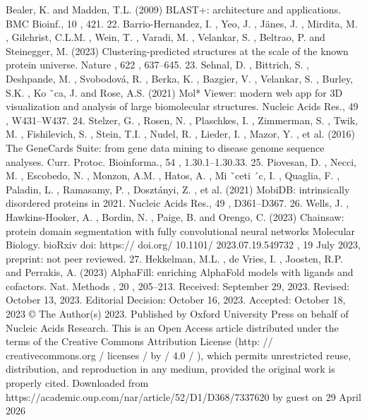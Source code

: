 Bealer, K. and Madden, T.L. (2009) BLAST+: architecture and
applications. BMC Bioinf., 10 , 421.
22. Barrio-Hernandez, I. , Yeo, J. , Jänes, J. , Mirdita, M. , Gilchrist, C.L.M. ,
Wein, T. , Varadi, M. , Velankar, S. , Beltrao, P. and Steinegger, M.
(2023) Clustering-predicted structures at the scale of the known
protein universe. Nature , 622 , 637–645.
23. Sehnal, D. , Bittrich, S. , Deshpande, M. , Svobodová, R. , Berka, K. ,
Bazgier, V. , Velankar, S. , Burley, S.K. , Ko ˇca, J. and Rose, A.S. (2021)
Mol* Viewer: modern web app for 3D visualization and analysis
of large biomolecular structures. Nucleic Acids Res., 49 ,
W431–W437.
24. Stelzer, G. , Rosen, N. , Plaschkes, I. , Zimmerman, S. , Twik, M. ,
Fishilevich, S. , Stein, T.I. , Nudel, R. , Lieder, I. , Mazor, Y. , et al. (2016)
The GeneCards Suite: from gene data mining to disease genome
sequence analyses. Curr. Protoc. Bioinforma., 54 , 1.30.1–1.30.33.
25. Piovesan, D. , Necci, M. , Escobedo, N. , Monzon, A.M. , Hatos, A. ,
Mi ˇceti ´c, I. , Quaglia, F. , Paladin, L. , Ramasamy, P. , Dosztányi, Z. , et al.
(2021) MobiDB: intrinsically disordered proteins in 2021. Nucleic
Acids Res., 49 , D361–D367.
26. Wells, J. , Hawkins-Hooker, A. , Bordin, N. , Paige, B. and Orengo, C.
(2023) Chainsaw: protein domain segmentation with fully
convolutional neural networks Molecular Biology. bioRxiv doi:
https:// doi.org/ 10.1101/ 2023.07.19.549732 , 19 July 2023,
preprint: not peer reviewed.
27. Hekkelman, M.L. , de Vries, I. , Joosten, R.P. and Perrakis, A. (2023)
AlphaFill: enriching AlphaFold models with ligands and cofactors.
Nat. Methods , 20 , 205–213.
Received: September 29, 2023. Revised: October 13, 2023. Editorial Decision: October 16, 2023. Accepted: October 18, 2023
© The Author(s) 2023. Published by Oxford University Press on behalf of Nucleic Acids Research.
This is an Open Access article distributed under the terms of the Creative Commons Attribution License (http: // creativecommons.org / licenses / by / 4.0 / ), which permits unrestricted reuse,
distribution, and reproduction in any medium, provided the original work is properly cited.
Downloaded from https://academic.oup.com/nar/article/52/D1/D368/7337620 by guest on 29 April 2026

